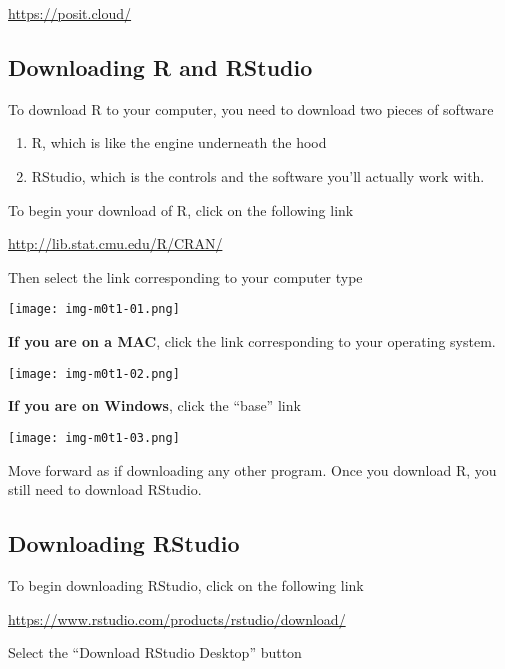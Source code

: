 \documentclass[11pt]{amsart}
\renewcommand{\(}{\left(}
\renewcommand{\)}{\right)}
\begin{document}
\begin{center}
  \href{https://posit.cloud/}{https://posit.cloud/}
\end{center}

\subsection{Downloading R and RStudio}

To download R to your computer, you need to download two pieces of software
\begin{enumerate}
\item R, which is like the engine underneath the hood
\item RStudio, which is the controls and the software you'll actually work with.
\end{enumerate}

To begin your download of R, click on the following link

\begin{center}
  \href{http://lib.stat.cmu.edu/R/CRAN/}{http://lib.stat.cmu.edu/R/CRAN/}
\end{center}

Then select the link corresponding to your computer type

\texttt{[image: img-m0t1-01.png]}

\textbf{If you are on a MAC}, click the link corresponding to your operating system. 

\texttt{[image: img-m0t1-02.png]}

\textbf{If you are on Windows}, click the ``base'' link

\texttt{[image: img-m0t1-03.png]}

Move forward as if downloading any other program. Once you download R, you still need to download RStudio.

\subsection{Downloading RStudio}

To begin downloading RStudio, click on the following link

\begin{center}
\href{https://www.rstudio.com/products/rstudio/download/}{https://www.rstudio.com/products/rstudio/download/}
\end{center}

Select the ``Download RStudio Desktop'' button
\end{document}
